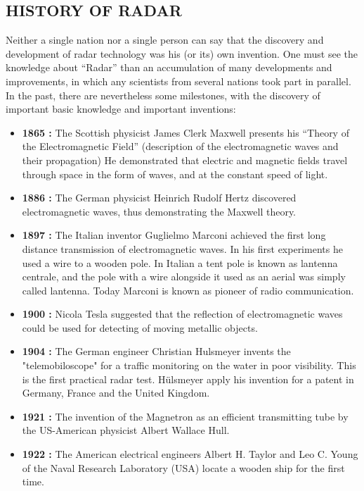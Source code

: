 \documentclass[14pt]{article} %
\begin{document}
\subsection{HISTORY OF RADAR}
 Neither a single nation nor a single person can say that the discovery and development of radar technology was his (or its) own invention. One must see the knowledge about “Radar” than an accumulation of many developments and improvements, in which any scientists from several nations took part in parallel. In the past, there are nevertheless some milestones, with the discovery of important basic knowledge and important inventions:
\begin{itemize}
\item \textbf {1865  :} The Scottish physicist James Clerk Maxwell presents his “Theory of the Electromagnetic Field” (description of the electromagnetic waves and their propagation) He demonstrated that electric and magnetic fields travel through space in the form of waves, and at the constant speed of light.

\item \textbf {1886 : }The German physicist Heinrich Rudolf Hertz  discovered electromagnetic waves, thus demonstrating the Maxwell theory.

\item \textbf { 1897 :  }The Italian inventor Guglielmo Marconi achieved the first long distance transmission of electromagnetic waves. In his first experiments he used a wire to a wooden pole. In Italian a tent pole is known as lantenna centrale, and the pole with a wire alongside it used as an aerial was simply called lantenna. Today Marconi is known as pioneer of radio communication.

\item \textbf {1900 :  }Nicola Tesla suggested that the reflection of electromagnetic waves could be used for detecting of moving metallic objects.

\item \textbf {1904 :  }The German engineer Christian Hulsmeyer invents the "telemobiloscope" for a traffic monitoring on the water in poor visibility. This is the first practical radar test. Hülsmeyer apply his invention for a patent in Germany, France and the United Kingdom.

\item \textbf {1921 :  }The invention of the Magnetron as an efficient transmitting tube by the US-American physicist Albert Wallace Hull.

\item \textbf {1922 : }The American electrical engineers Albert H. Taylor and Leo C. Young of the Naval Research Laboratory (USA) locate a wooden ship for the first time.


\end{itemize}
\end{document}
